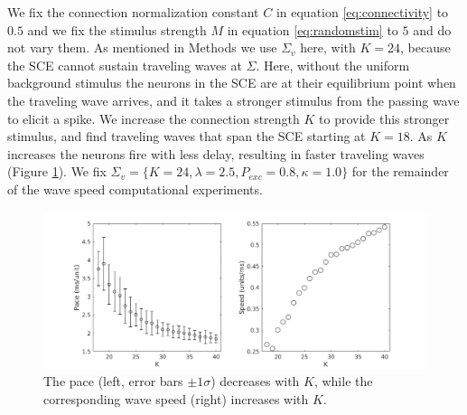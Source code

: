 \documentclass[12pt]{article}
\begin{document}
We fix the connection normalization constant $C$ in equation \ref{eq:connectivity} to $0.5$ and we fix the stimulus strength $M$ in equation \ref{eq:randomstim} to $5$ and do not vary them.
As mentioned in Methods we use $\Sigma_v$ here, with $K=24$, because the SCE cannot sustain traveling waves at $\Sigma$. 
Here, without the uniform background stimulus the neurons in the SCE are at their equilibrium point when the traveling wave arrives, and it takes a stronger stimulus from the passing wave to elicit a spike.
We increase the connection strength $K$ to provide this stronger stimulus, and find traveling waves that span the SCE starting at $K=18$. 
As $K$ increases the neurons fire with less delay, resulting in faster traveling waves (Figure \ref{fig:delay_k}).
We fix $\Sigma_v = \{K=24,\lambda=2.5,P_{exc}=0.8,\kappa=1.0 \}$ for the remainder of the wave speed computational experiments.
\begin{figure}[!htb]
 \caption{The pace (left, error bars $\pm 1 \sigma$) decreases with $K$, while the corresponding wave speed (right) increases with $K$. }
 \label{fig:delay_k}
 \centering
   \includegraphics[width=\textwidth]{fig/WaveSpeed_K}
\end{figure}

\FloatBarrier
\end{document}
